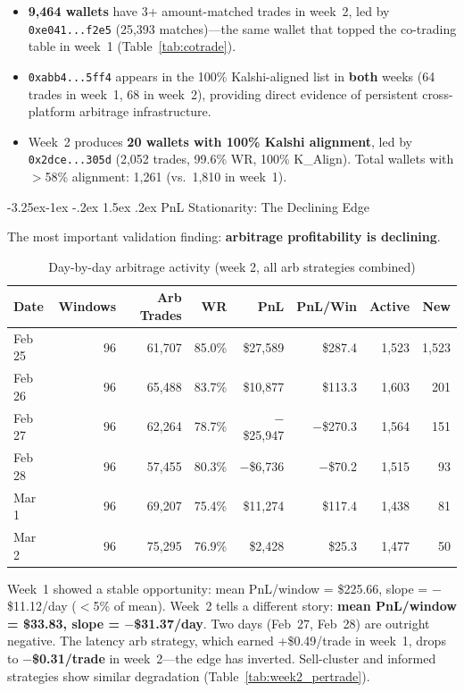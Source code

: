 \documentclass[11pt,a4paper]{article}
\makeatletter
\renewcommand\subsection{\@startsection{subsection}{2}{\z@}%
  {-3.25ex\@plus -1ex \@minus -.2ex}%
  {1.5ex \@plus .2ex}%
  {\normalfont\large\bfseries}}
\makeatother
\begin{document}
\begin{itemize}[nosep]
    \item \textbf{9,464 wallets} have 3+ amount-matched trades in week~2, led by \texttt{0xe041...f2e5} (25,393 matches)---the same wallet that topped the co-trading table in week~1 (Table~\ref{tab:cotrade}).
    \item \texttt{0xabb4...5ff4} appears in the 100\% Kalshi-aligned list in \textbf{both} weeks (64 trades in week~1, 68 in week~2), providing direct evidence of persistent cross-platform arbitrage infrastructure.
    \item Week~2 produces \textbf{20 wallets with 100\% Kalshi alignment}, led by \texttt{0x2dce...305d} (2,052 trades, 99.6\% WR, 100\% K\_Align). Total wallets with $>$58\% alignment: 1,261 (vs.\ 1,810 in week~1).
\end{itemize}

\subsection{PnL Stationarity: The Declining Edge}

The most important validation finding: \textbf{arbitrage profitability is declining}.

\begin{table}[H]
\centering
\caption{Day-by-day arbitrage activity (week 2, all arb strategies combined)}
\label{tab:week2_temporal}
\small
\begin{tabular}{@{}lrrrrrrr@{}}
\toprule
\textbf{Date} & \textbf{Windows} & \textbf{Arb Trades} & \textbf{WR} & \textbf{PnL} & \textbf{PnL/Win} & \textbf{Active} & \textbf{New} \\
\midrule
Feb 25 & 96 & 61,707  & 85.0\% & \$27,589 & \$287.4 & 1,523 & 1,523 \\
Feb 26 & 96 & 65,488  & 83.7\% & \$10,877 & \$113.3 & 1,603 & 201 \\
Feb 27 & 96 & 62,264  & 78.7\% & $-$\$25,947 & $-$\$270.3 & 1,564 & 151 \\
Feb 28 & 96 & 57,455  & 80.3\% & $-$\$6,736 & $-$\$70.2 & 1,515 & 93 \\
Mar 1  & 96 & 69,207  & 75.4\% & \$11,274 & \$117.4 & 1,438 & 81 \\
Mar 2  & 96 & 75,295  & 76.9\% & \$2,428  & \$25.3  & 1,477 & 50 \\
\bottomrule
\end{tabular}
\end{table}

Week~1 showed a stable opportunity: mean PnL/window = \$225.66, slope = $-$\$11.12/day ($<$5\% of mean). Week~2 tells a different story: \textbf{mean PnL/window = \$33.83, slope = $-$\$31.37/day}. Two days (Feb~27, Feb~28) are outright negative. The latency arb strategy, which earned +\$0.49/trade in week~1, drops to \textbf{$-$\$0.31/trade} in week~2---the edge has inverted. Sell-cluster and informed strategies show similar degradation (Table~\ref{tab:week2_pertrade}).
\end{document}
